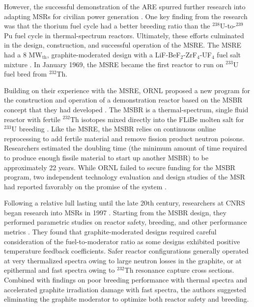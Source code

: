 However, the successful demonstration of the \gls{ARE} spurred further
research into adapting \glspl{MSR} for civilian power generation
\cite{rosenthal_molten-salt_1970}. One key finding from the
research was that the thorium fuel cycle had a better breeding ratio than the
$^{238}$U-to-$^{239}$Pu fuel cycle in thermal-spectrum reactors.
Ultimately, these efforts culminated in the design, construction, and
successful operation of the \gls{MSRE}. The \gls{MSRE} had a 8 MW$_{\text{th}}$,
graphite-moderated design with a LiF-BeF$_2$-ZrF$_4$-UF$_4$ fuel salt mixture
\cite{haubenreich_experience_1970}. In January 1969, the \gls{MSRE} became the
first reactor to run on $^{233}$U fuel bred from $^{232}$Th.

Building on their experience with the \gls{MSRE}, \gls{ORNL} proposed a
new program for the construction and operation of a demonstration reactor
based on the \gls{MSBR} concept that they had
developed \cite{macpherson_molten_1985}. The \gls{MSBR} is a thermal-spectrum,
single fluid reactor with fertile $^{232}$Th isotopes mixed directly into the
FLiBe molten salt for $^{233}$U breeding \cite{robertson_conceptual_1971}. Like the
\gls{MSRE}, the \gls{MSBR} relies on continuous online reprocessing to add
fertile material and remove fission product neutron poisons. Researchers
estimated the doubling time (the minimum amount of time required to produce
enough fissile material to start up another \gls{MSBR}) to be
approximately 22 years. While \gls{ORNL} failed to secure funding for the
\gls{MSBR} program, two independent
technology evaluation and design studies of the \gls{MSR} had reported
favorably on the promise of the system \cite{macpherson_molten_1985}.

Following a relative lull lasting until the late 20th century, researchers at \gls{CNRS} began
research into \glspl{MSR} in 1997 \cite{heuer_simulation_2010}. Starting from the \gls{MSBR}
design, they performed parametric studies on reactor safety, breeding, and other performance
metrics \cite{mathieu_thorium_2006}. They found that graphite-moderated designs required careful
consideration of the fuel-to-moderator ratio as some designs exhibited positive temperature
feedback coefficients. Safer reactor configurations generally operated at very thermalized spectra
owing to large neutron losses in the graphite, or at epithermal and fast spectra owing to
$^{232}$Th resonance capture cross sections. Combined with findings on poor breeding performance
with thermal spectra and accelerated graphite irradiation damage with fast spectra, the authors
suggested eliminating the graphite moderator to optimize both reactor safety and breeding.

